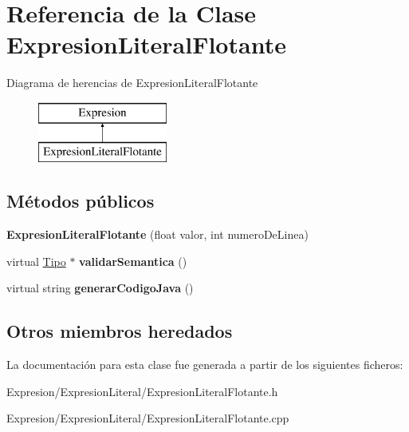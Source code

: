 \hypertarget{class_expresion_literal_flotante}{\section{Referencia de la Clase Expresion\-Literal\-Flotante}
\label{class_expresion_literal_flotante}
}
Diagrama de herencias de Expresion\-Literal\-Flotante\begin{figure}[H]
\begin{center}
\leavevmode
\includegraphics[height=2.000000cm]{class_expresion_literal_flotante}
\end{center}
\end{figure}
\subsection*{Métodos públicos}
\begin{DoxyCompactItemize}
\item 
\hypertarget{class_expresion_literal_flotante_aa665968af6490edaa0d39b5c492d1a66}{{\bfseries Expresion\-Literal\-Flotante} (float valor, int numero\-De\-Linea)}\label{class_expresion_literal_flotante_aa665968af6490edaa0d39b5c492d1a66}

\item 
\hypertarget{class_expresion_literal_flotante_af76f6c6bdcbeb52bf21181816cb467cd}{virtual \hyperlink{class_tipo}{Tipo} $\ast$ {\bfseries validar\-Semantica} ()}\label{class_expresion_literal_flotante_af76f6c6bdcbeb52bf21181816cb467cd}

\item 
\hypertarget{class_expresion_literal_flotante_a2bbdfdf8c949d75b5b3987ba8698cc25}{virtual string {\bfseries generar\-Codigo\-Java} ()}\label{class_expresion_literal_flotante_a2bbdfdf8c949d75b5b3987ba8698cc25}

\end{DoxyCompactItemize}
\subsection*{Otros miembros heredados}


La documentación para esta clase fue generada a partir de los siguientes ficheros\-:\begin{DoxyCompactItemize}
\item 
Expresion/\-Expresion\-Literal/Expresion\-Literal\-Flotante.\-h\item 
Expresion/\-Expresion\-Literal/Expresion\-Literal\-Flotante.\-cpp\end{DoxyCompactItemize}
